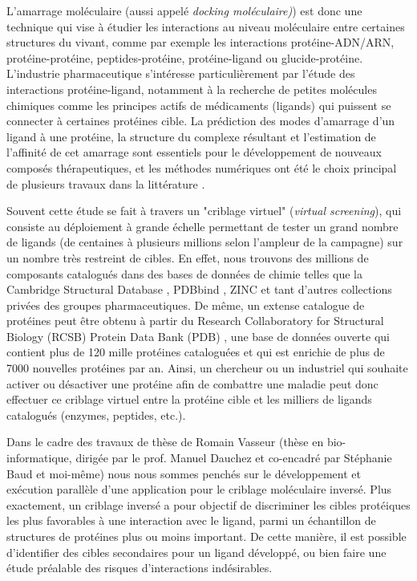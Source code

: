 L'amarrage moléculaire (aussi appelé \emph{docking moléculaire)}) est donc une technique qui vise à étudier les interactions au niveau moléculaire entre certaines structures du vivant, comme par exemple les interactions protéine-ADN/ARN, protéine-protéine, peptides-protéine, protéine-ligand ou glucide-protéine. L'industrie pharmaceutique s'intéresse particulièrement par l'étude des interactions protéine-ligand, notamment à la recherche de petites molécules chimiques comme les principes actifs de médicaments (ligands) qui puissent se connecter à certaines protéines cible. La prédiction des modes d'amarrage d'un ligand à une protéine, la structure du complexe résultant et l'estimation de l'affinité de cet amarrage sont essentiels pour le développement de nouveaux composés thérapeutiques, et les méthodes numériques ont été le choix principal de plusieurs travaux dans la littérature \cite{1}\cite{9}\cite{19}.

 Souvent cette étude se fait à travers un "criblage virtuel" (\emph{virtual screening}), qui consiste au déploiement à grande échelle permettant de tester un grand nombre de ligands (de centaines à plusieurs millions selon l’ampleur de la campagne) sur un nombre très restreint de cibles. En effet, nous trouvons des millions de composants catalogués dans des bases de données de chimie telles que la Cambridge Structural Database \cite{2}, PDBbind  \cite{27} \cite{28}, ZINC \cite{16} et tant d'autres collections privées des groupes pharmaceutiques. De même, un extense catalogue de protéines peut être obtenu à partir du Research Collaboratory for Structural Biology (RCSB) Protein Data Bank (PDB) \cite{26}, une base de données ouverte qui contient plus de 120 mille protéines cataloguées et qui est enrichie de plus de 7000 nouvelles protéines par an. Ainsi, un chercheur ou un industriel qui souhaite activer ou désactiver une protéine afin de combattre une maladie peut donc effectuer ce criblage virtuel entre la protéine cible et les milliers de ligands catalogués (enzymes, peptides, etc.).  

Dans le cadre des travaux de thèse de Romain Vasseur (thèse en bio-informatique, dirigée par le prof. Manuel Dauchez et co-encadré par Stéphanie Baud et moi-même) nous nous sommes penchés sur le développement et exécution parallèle d'une application pour le criblage moléculaire inversé. Plus exactement, un criblage inversé a pour objectif de discriminer les cibles protéiques les plus favorables à une interaction avec le ligand, parmi un échantillon de structures de protéines plus ou moins important. De cette manière, il est possible d'identifier des cibles secondaires pour un ligand développé, ou bien faire une étude préalable des risques d'interactions indésirables. 

